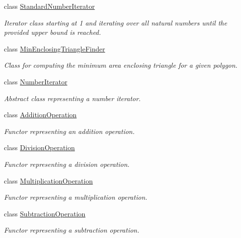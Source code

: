 \begin{DoxyCompactItemize}
class \hyperlink{classmultiscale_1_1StandardNumberIterator}{\-Standard\-Number\-Iterator}
\begin{DoxyCompactList}\small\item\em \-Iterator class starting at 1 and iterating over all natural numbers until the provided upper bound is reached. \end{DoxyCompactList}\item 
class \hyperlink{classmultiscale_1_1MinEnclosingTriangleFinder}{\-Min\-Enclosing\-Triangle\-Finder}
\begin{DoxyCompactList}\small\item\em \-Class for computing the minimum area enclosing triangle for a given polygon. \end{DoxyCompactList}\item 
class \hyperlink{classmultiscale_1_1NumberIterator}{\-Number\-Iterator}
\begin{DoxyCompactList}\small\item\em \-Abstract class representing a number iterator. \end{DoxyCompactList}\item 
class \hyperlink{classmultiscale_1_1AdditionOperation}{\-Addition\-Operation}
\begin{DoxyCompactList}\small\item\em \-Functor representing an addition operation. \end{DoxyCompactList}\item 
class \hyperlink{classmultiscale_1_1DivisionOperation}{\-Division\-Operation}
\begin{DoxyCompactList}\small\item\em \-Functor representing a division operation. \end{DoxyCompactList}\item 
class \hyperlink{classmultiscale_1_1MultiplicationOperation}{\-Multiplication\-Operation}
\begin{DoxyCompactList}\small\item\em \-Functor representing a multiplication operation. \end{DoxyCompactList}\item 
class \hyperlink{classmultiscale_1_1SubtractionOperation}{\-Subtraction\-Operation}
\begin{DoxyCompactList}\small\item\em \-Functor representing a subtraction operation. \end{DoxyCompactList}\item 

\end{DoxyCompactItemize}
